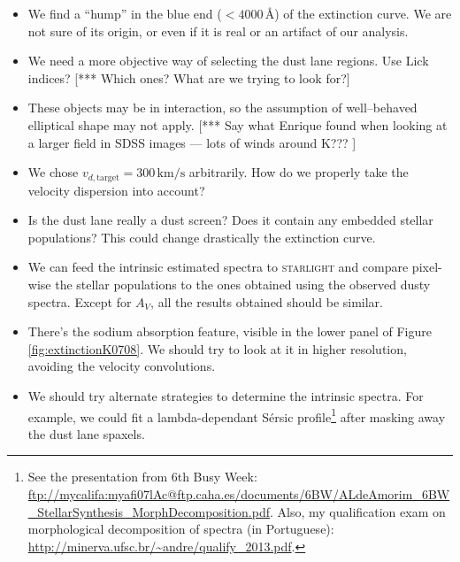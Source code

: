 \documentclass[a4paper]{article}
\newcommand{\angstrom}{\text{\AA}}
\def\starlight{\textsc{starlight}\xspace}
\begin{document}
\begin{itemize} 

\item We find a ``hump'' in the blue end ($< 4000\,\angstrom$) of the extinction
curve. We are not sure of its origin, or even if it is real or an artifact of
our analysis.

\item We need a more objective way of selecting the dust lane regions. Use Lick
indices? [*** Which ones? What are we trying to look for?]

\item These objects may be in interaction, so the assumption of well--behaved
elliptical shape may not apply. [*** Say what Enrique found when
looking at a larger field in SDSS images --- lots of winds around K??? ]

\item We chose $v_{d,\text{target}} = 300\,\mathrm{km/s}$
  arbitrarily. How do we properly take the velocity dispersion into
  account?

\item Is the dust lane really a dust screen? Does it contain any embedded
stellar populations? This could change drastically the extinction curve.

\item We can feed the intrinsic estimated spectra to \starlight and compare
pixel-wise the stellar populations to the ones obtained using the observed dusty spectra.
Except for $A_V$, all the results obtained should be similar.

\item There's the sodium absorption feature, visible in the lower panel of
Figure \ref{fig:extinctionK0708}. We should try to look at it in higher resolution,
avoiding the velocity convolutions.

\item We should try alternate strategies to determine the intrinsic spectra. For
example, we could fit a lambda-dependant Sérsic profile\footnote{See the
presentation from 6th Busy Week:
\url{ftp://mycalifa:myafi07lAc@ftp.caha.es/documents/6BW/ALdeAmorim_6BW_StellarSynthesis_MorphDecomposition.pdf}.
Also, my qualification exam on morphological decomposition of spectra (in
Portuguese):
\url{http://minerva.ufsc.br/~andre/qualify_2013.pdf}.} after masking away the
dust lane spaxels.

\end{itemize}



\end{document}
